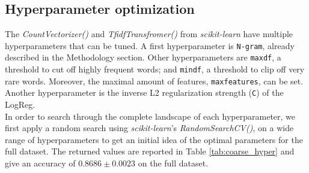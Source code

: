 \subsection{Hyperparameter optimization}
The \textit{CountVectorizer()} and \textit{TfidfTransfromer()} from \textit{scikit-learn} have multiple hyperparameters that can be tuned. 
A first hyperparameter is \texttt{N-gram}, already described in the Methodology section. 
Other hyperparameters are \texttt{max\textunderscore df}, a threshold to cut off highly frequent words; and \texttt{min\textunderscore df}, a threshold to clip off very rare words. 
Moreover, the maximal amount of features, \texttt{max\textunderscore features}, can be set. 
Another hyperparameter is the inverse L2 regularization strength (\texttt{C}) of the LogReg. \\
In order to search through the complete landscape of each hyperparameter, we first apply a random search using  \textit{scikit-learn}'s \textit{RandomSearchCV()}, on a wide range of hyperparameters to get an initial idea of the optimal parameters for the full dataset. 
The returned values are reported in Table \ref{tab:coarse_hyper} and give an accuracy of $0.8686 \pm 0.0023$ on the full dataset.

